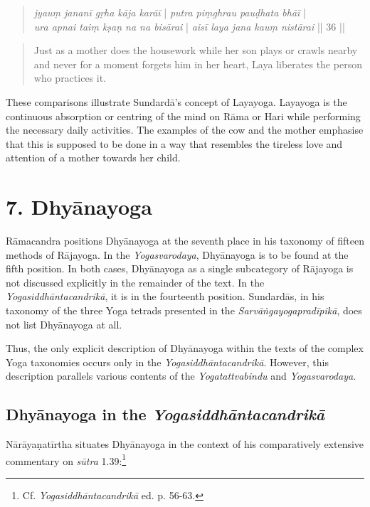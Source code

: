 \begin{quote}
\textit{jyauṃ jananī gṛha kāja karāī} | \textit{putra piṃghrau pauḍhata bhāī} |\\
\textit{ura apnai taiṃ kṣaṇ na na bisārai} | \textit{aisī laya jana kauṃ nistārai} || 36 ||
\end{quote}
\begin{quote}
Just as a mother does the housework while her son plays or crawls nearby and never for a moment forgets him in her heart, Laya liberates the person who practices it.
\end{quote}

These comparisons illustrate Sundardā's concept of Layayoga. Layayoga is the continuous absorption or centring of the mind on Rāma or Hari while performing the necessary daily activities. The examples of the cow and the mother emphasise that this is supposed to be done in a way that resembles the tireless love and attention of a mother towards her child.

\section{7. Dhyānayoga}
\label{dhyānayogaintro}

Rāmacandra positions Dhyānayoga at the seventh place in his taxonomy of fifteen methods of Rājayoga. In the \textit{Yogasvarodaya}, Dhyānayoga is to be found at the fifth position. In both cases, Dhyānayoga as a single subcategory of Rājayoga is not discussed explicitly in the remainder of the text. In the \textit{Yogasiddhāntacandrikā}, it is in the fourteenth position. Sundardās, in his taxonomy of the three Yoga tetrads presented in the \textit{Sarvāṅgayogapradīpikā}, does not list Dhyānayoga at all.

Thus, the only explicit description of Dhyānayoga within the texts of the complex Yoga taxonomies occurs only in the \textit{Yogasiddhāntacandrikā}. However, this description parallels various contents of the \textit{Yogatattvabindu} and \textit{Yogasvarodaya}.   

\subsection{Dhyānayoga in the \textit{Yogasiddhāntacandrikā}}

Nārāyaṇatīrtha situates Dhyānayoga in the context of his comparatively extensive commentary on \textit{sūtra} 1.39:\footnote{Cf. \emph{Yogasiddhāntacandrikā} ed. p. 56-63.}

